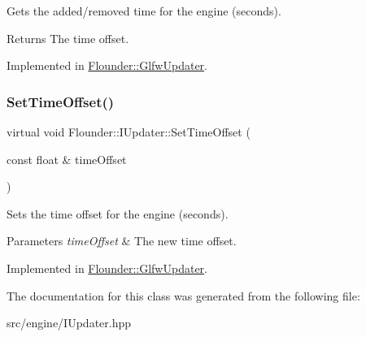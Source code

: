Gets the added/removed time for the engine (seconds). 

\begin{DoxyReturn}{Returns}
The time offset. 
\end{DoxyReturn}


Implemented in \hyperlink{class_flounder_1_1_glfw_updater_a226e133e14bd058d07e0d19003371c0d}{Flounder\+::\+Glfw\+Updater}.

\mbox{\label{class_flounder_1_1_i_updater_a810d7c8481aacd2a1061f540683c3beb}} 
\subsubsection{\texorpdfstring{Set\+Time\+Offset()}{SetTimeOffset()}}
{\footnotesize\ttfamily virtual void Flounder\+::\+I\+Updater\+::\+Set\+Time\+Offset (\begin{DoxyParamCaption}\item[{const float \&}]{time\+Offset }\end{DoxyParamCaption})\hspace{0.3cm}{\ttfamily [pure virtual]}}



Sets the time offset for the engine (seconds). 


\begin{DoxyParams}{Parameters}
{\em time\+Offset} & The new time offset. \\
\hline
\end{DoxyParams}


Implemented in \hyperlink{class_flounder_1_1_glfw_updater_add7ecb2ba97449eb4b2de6e86a48c1a8}{Flounder\+::\+Glfw\+Updater}.



The documentation for this class was generated from the following file\+:\begin{DoxyCompactItemize}
\item 
src/engine/I\+Updater.\+hpp\end{DoxyCompactItemize}
